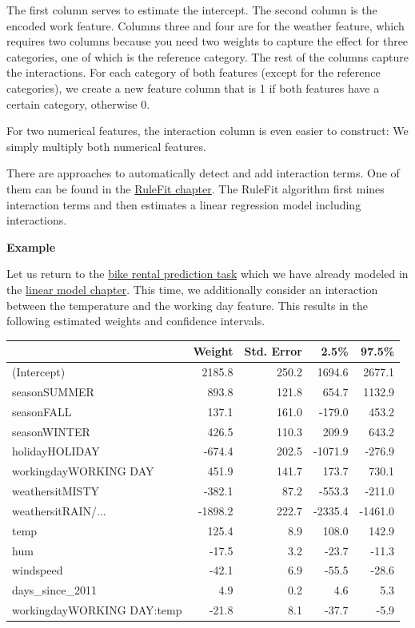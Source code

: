 \documentclass[12pt,]{krantz}
\begin{document}
The first column serves to estimate the intercept. The second column is
the encoded work feature. Columns three and four are for the weather
feature, which requires two columns because you need two weights to
capture the effect for three categories, one of which is the reference
category. The rest of the columns capture the interactions. For each
category of both features (except for the reference categories), we
create a new feature column that is 1 if both features have a certain
category, otherwise 0.

For two numerical features, the interaction column is even easier to
construct: We simply multiply both numerical features.

There are approaches to automatically detect and add interaction terms.
One of them can be found in the \protect\hyperlink{rulefit}{RuleFit
chapter}. The RuleFit algorithm first mines interaction terms and then
estimates a linear regression model including interactions.

\textbf{Example}

Let us return to the \protect\hyperlink{bike-data}{bike rental
prediction task} which we have already modeled in the
\protect\hyperlink{limo}{linear model chapter}. This time, we
additionally consider an interaction between the temperature and the
working day feature. This results in the following estimated weights and
confidence intervals.

\begin{tabular}{>{\raggedright\arraybackslash}p{4.1cm}|r|r|r|r}
\hline
  & Weight & Std. Error & 2.5\% & 97.5\%\\
\hline
(Intercept) & 2185.8 & 250.2 & 1694.6 & 2677.1\\
\hline
seasonSUMMER & 893.8 & 121.8 & 654.7 & 1132.9\\
\hline
seasonFALL & 137.1 & 161.0 & -179.0 & 453.2\\
\hline
seasonWINTER & 426.5 & 110.3 & 209.9 & 643.2\\
\hline
holidayHOLIDAY & -674.4 & 202.5 & -1071.9 & -276.9\\
\hline
workingdayWORKING DAY & 451.9 & 141.7 & 173.7 & 730.1\\
\hline
weathersitMISTY & -382.1 & 87.2 & -553.3 & -211.0\\
\hline
weathersitRAIN/... & -1898.2 & 222.7 & -2335.4 & -1461.0\\
\hline
temp & 125.4 & 8.9 & 108.0 & 142.9\\
\hline
hum & -17.5 & 3.2 & -23.7 & -11.3\\
\hline
windspeed & -42.1 & 6.9 & -55.5 & -28.6\\
\hline
days\_since\_2011 & 4.9 & 0.2 & 4.6 & 5.3\\
\hline
workingdayWORKING DAY:temp & -21.8 & 8.1 & -37.7 & -5.9\\
\hline
\end{tabular}
\end{document}

